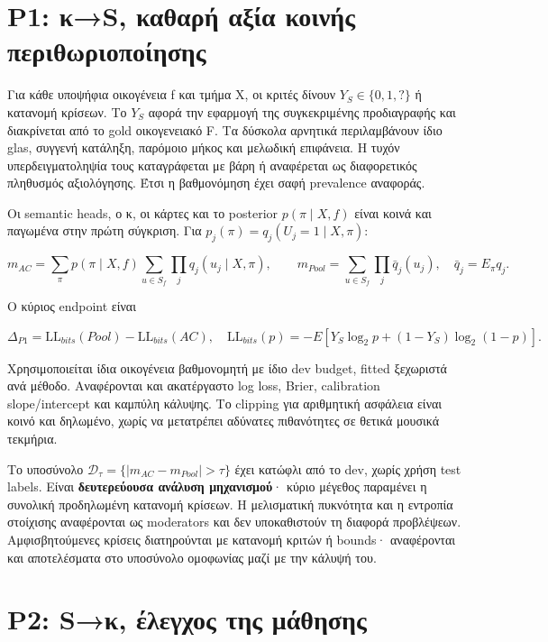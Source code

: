 \documentclass[
  10pt,
  a4paper,
]{report}
\begin{document}
\section{P1: κ→S, καθαρή αξία κοινής
περιθωριοποίησης}\label{p1-ux3bas-ux3baux3b1ux3b8ux3b1ux3c1ux3ae-ux3b1ux3beux3afux3b1-ux3baux3bfux3b9ux3bdux3aeux3c2-ux3c0ux3b5ux3c1ux3b9ux3b8ux3c9ux3c1ux3b9ux3bfux3c0ux3bfux3afux3b7ux3c3ux3b7ux3c2}

Για κάθε υποψήφια οικογένεια f και τμήμα X, οι κριτές δίνουν
\(Y_S\in\{0,1,?\}\) ή κατανομή κρίσεων. Το \(Y_S\) αφορά την εφαρμογή
της συγκεκριμένης προδιαγραφής και διακρίνεται από το gold οικογενειακό
F. Τα δύσκολα αρνητικά περιλαμβάνουν ίδιο glas, συγγενή κατάληξη,
παρόμοιο μήκος και μελωδική επιφάνεια. Η τυχόν υπερδειγματοληψία τους
καταγράφεται με βάρη ή αναφέρεται ως διαφορετικός πληθυσμός αξιολόγησης.
Έτσι η βαθμονόμηση έχει σαφή prevalence αναφοράς.

Οι semantic heads, ο κ, οι κάρτες και το posterior \(p(\pi\mid X,f)\)
είναι κοινά και παγωμένα στην πρώτη σύγκριση. Για
\(p_j(\pi)=q_j(U_j=1\mid X,\pi)\):

\[
m_{AC}=\sum_\pi p(\pi\mid X,f)\sum_{u\in S_f}\prod_jq_j(u_j\mid X,\pi),\qquad
m_{Pool}=\sum_{u\in S_f}\prod_j\bar q_j(u_j),\quad
\bar q_j=E_\pi q_j.
\]

Ο κύριος endpoint είναι

\[
\Delta_{P1}=\mathrm{LL}_{bits}(Pool)-\mathrm{LL}_{bits}(AC),\quad
\mathrm{LL}_{bits}(p)=-E[Y_S\log_2p+(1-Y_S)\log_2(1-p)].
\]

Χρησιμοποιείται ίδια οικογένεια βαθμονομητή με ίδιο dev budget, fitted
ξεχωριστά ανά μέθοδο. Αναφέρονται και ακατέργαστο log loss, Brier,
calibration slope/intercept και καμπύλη κάλυψης. Το clipping για
αριθμητική ασφάλεια είναι κοινό και δηλωμένο, χωρίς να μετατρέπει
αδύνατες πιθανότητες σε θετικά μουσικά τεκμήρια.

Το υποσύνολο \(\mathcal D_\tau=\{|m_{AC}-m_{Pool}|>\tau\}\) έχει κατώφλι
από το dev, χωρίς χρήση test labels. Είναι \textbf{δευτερεύουσα ανάλυση
μηχανισμού}· κύριο μέγεθος παραμένει η συνολική προδηλωμένη κατανομή
κρίσεων. Η μελισματική πυκνότητα και η εντροπία στοίχισης αναφέρονται ως
moderators και δεν υποκαθιστούν τη διαφορά προβλέψεων. Αμφισβητούμενες
κρίσεις διατηρούνται με κατανομή κριτών ή bounds· αναφέρονται και
αποτελέσματα στο υποσύνολο ομοφωνίας μαζί με την κάλυψή του.

\section{P2: S→κ, έλεγχος της
μάθησης}\label{p2-sux3ba-ux3adux3bbux3b5ux3b3ux3c7ux3bfux3c2-ux3c4ux3b7ux3c2-ux3bcux3acux3b8ux3b7ux3c3ux3b7ux3c2}
\end{document}

